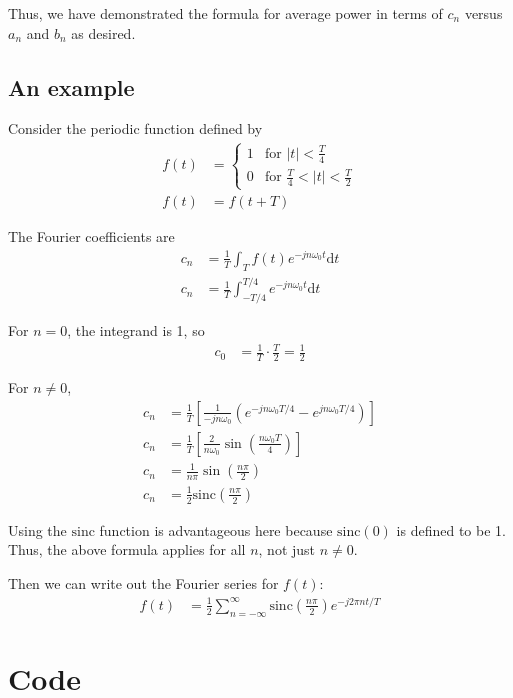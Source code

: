\documentclass[twocolumn]{myarticle}
\newcommand{\sinc}{\text{sinc}}
\renewcommand{\d}{\mathrm{d}}
\begin{document}
Thus, we have demonstrated the formula for average power in terms of $ c_n $ versus $ a_n $ and $ b_n $ as desired.

\subsection{An example}
\label{subsec:an_example}

Consider the periodic function defined by
\begin{align}
    f(t) &= \begin{cases} 1 & \text{for } |t| < \frac{T}{4} \\ 0 & \text{for } \frac{T}{4} < |t| < \frac{T}{2} \end{cases}
    \\
    f(t) &= f(t + T)
\end{align}

The Fourier coefficients are
\begin{align}
    c_n &= \frac{1}{T} \int_{T} f(t) e^{-j n \omega_0 t} \d t
    \\
    c_n &= \frac{1}{T} \int_{-T/4}^{T/4} e^{-j n \omega_0 t} \d t
\end{align}

For $ n = 0 $, the integrand is 1, so
\begin{align}
    c_0 &= \frac{1}{T} \cdot \frac{T}{2} = \frac{1}{2}
\end{align}

For $ n \neq 0 $,
\begin{align}
    c_n &= \frac{1}{T} \left[ \frac{1}{-j n \omega_0} \left( e^{-j n \omega_0 T/4} - e^{jn \omega_0 T/4} \right) \right]
    \\
    c_n &= \frac{1}{T} \left[ \frac{2}{ n \omega_0} \sin\left(\frac{n \omega_0 T}{4} \right) \right]
    \\
    c_n &= \frac{1}{n \pi} \sin\left(\frac{n \pi}{2} \right)
    \\
    c_n &= \frac{1}{2} \sinc\left(\frac{n \pi}{2} \right)
\end{align}

Using the $ \sinc $ function is advantageous here because $ \sinc(0) $ is defined to be 1. 
Thus, the above formula applies for all $ n $, not just $ n \neq 0 $. 

Then we can write out the Fourier series for $ f(t) $:
\begin{align}
    f(t) &= \frac{1}{2} \sum_{n = -\infty}^{\infty} \sinc \left( \frac{n \pi}{2} \right) e^{- j 2 \pi n t / T}
\end{align}


\onecolumn

\section{Code}
\label{sec:code}

%
\end{document}
